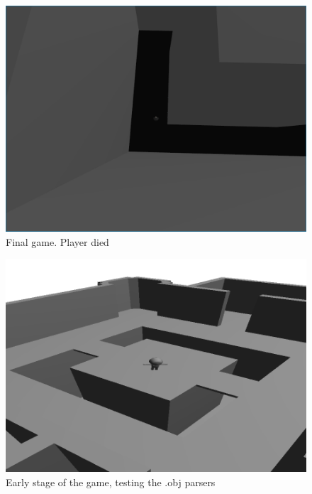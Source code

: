 \documentclass[12pt,a4paper,titlepage]{article}
\begin{document}
\begin{figure}[h]
      \centering
      \includegraphics[width=\textwidth]{screen3.png}
      \caption{Final game. Player died}
\end{figure}

\begin{figure}[h]
      \centering
      \includegraphics[width=\textwidth]{screen0.png}
      \caption{Early stage of the game, testing the .obj parsers}
\end{figure}
\end{document}
